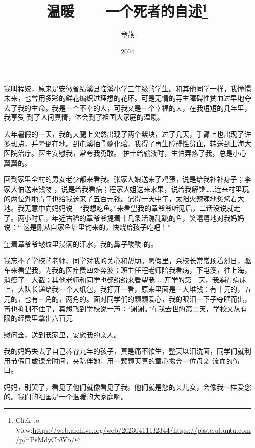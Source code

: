 \documentclass{article}
\title{温暖——一个死者的自述\footnote{Click to View:\url{https://web.archive.org/web/20230411132344/https://paste.ubuntu.com/p/nPsMdyCbWb/}}}
\author{章燕}
\date{2004}
\begin{document}

\maketitle


\Large

﻿我叫程姣，原来是安徽省绩溪县临溪小学三年级的学生。和其他同学一样，我憧憬未来，也曾用多彩的鲜花编织过理想的花环。可是无情的再生障碍性贫血过早地夺去了我的生命。我是一个不幸的人，可我又是一个幸福的人，在我短短的几年里，我享受
到了人间真情，体会到了祖国大家庭的温暖。 

去年暑假的一天，我的大腿上突然出现了两个紫块，过了几天，手臂上也出现了许多斑点，并晕倒在地。到屯溪抽骨髓化验，我得了再生障碍性贫血，转送到上海大医院治疗。医生安慰我，常夸我勇敢。
护士给输液时，生怕弄疼了我，总是小心翼翼的。 

回到家里全村的男女老少都来看我。张家大娘送来了鸡蛋，说是给我补补身子；李家大伯送来钱物
\newpage
，说是给我看病；程家大姐送来水果，说给我解馋……连来村里玩的两位外地青年也给我送来了五百元钱。记得一天中午，太阳火辣辣地炙烤着大地。我无意中向妈妈说：“我想吃鱼。”来看望我的章爷爷听见后，二话没说就走了。两小时后，年近古稀的章爷爷提着十几条活蹦乱跳的鱼，笑嘻嘻地对我妈妈说：“
这是刚从自家鱼塘里钓来的，快烧给孩子吃吧！” 

望着章爷爷皱纹里浸满的汗水，我的鼻子酸酸
的。 

我忘不了学校的老师、同学对我的关心和帮助。暑假里，余校长常常顶着烈日，驱车来看望我，为我的医疗费四处奔波；班主任程老师陪我看病，下屯溪，往上海，消瘦了一大截；其他老师和同学也都纷纷来看望我……开学的第一天，我躺在病床上，大队长递给我一个大纸包，我打开一看，原来里面是一大堆钱：有十元的，五元的，也有一角的，两角的。面对同学们的颗颗爱心，我的眼泪一下子夺眶而出，再也抑制不住了，真想飞到学校说一声：“谢谢。”在我去世的第二天，学校又从有限的经费里拿出六百元
\newpage

慰问金，送到我家里，安慰我的亲人。 

我的妈妈失去了自己养育九年的孩子，真是痛不欲生，整天以泪洗面，同学们就利用节假日或课余时间，来陪伴她，用一颗颗天真的童心愈合一位母亲
流血的伤口。 

妈妈，别哭了，看见了他们就像看见了我，他们就是您的亲儿女，会像我一样爱您的。我们的祖国是一个温暖的大家庭啊。
\end{document}
